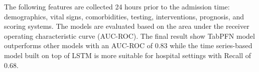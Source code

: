 \documentclass[../main.tex]{subfiles}
\begin{document}
The following features are collected 24 hours prior to the admission time: demographics, vital signs, comorbidities, testing, interventions, prognosis, and scoring systems. 
The models are evaluated based on the area under the receiver operating characteristic curve (AUC-ROC). 
The final result show TabPFN model outperforms other models with an AUC-ROC of 0.83 while the time series-based model built on top of LSTM is more suitable for hospital settings with Recall of  0.68.

\end{document}
